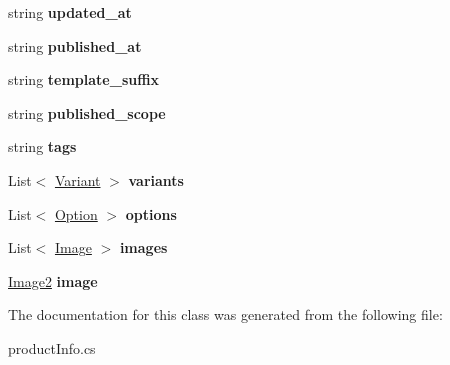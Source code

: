 \begin{DoxyCompactItemize}
string {\bfseries updated\+\_\+at}
\item 
\mbox{\label{class_nexus_1_1_product_a0d284c48bf5e01138e99da3a49663699}} 
string {\bfseries published\+\_\+at}
\item 
\mbox{\label{class_nexus_1_1_product_af2a337fbef04f21f3df79086cc3abd3c}} 
string {\bfseries template\+\_\+suffix}
\item 
\mbox{\label{class_nexus_1_1_product_a1556d89d0f3d8b35ce267019f8f48954}} 
string {\bfseries published\+\_\+scope}
\item 
\mbox{\label{class_nexus_1_1_product_a7acfcece032393bd1ab2ded530b62d09}} 
string {\bfseries tags}
\item 
\mbox{\label{class_nexus_1_1_product_ab179f1716bce65807b714e4640df11a0}} 
List$<$ \mbox{\hyperlink{class_nexus_1_1_variant}{Variant}} $>$ {\bfseries variants}
\item 
\mbox{\label{class_nexus_1_1_product_ab58631dc5cb9e28ec07a6f25051fd5d9}} 
List$<$ \mbox{\hyperlink{class_nexus_1_1_option}{Option}} $>$ {\bfseries options}
\item 
\mbox{\label{class_nexus_1_1_product_a904625c7d82e1eb3d7dc9279f2a1d5b8}} 
List$<$ \mbox{\hyperlink{class_nexus_1_1_image}{Image}} $>$ {\bfseries images}
\item 
\mbox{\label{class_nexus_1_1_product_aa3d5f3e23d067eb29eba02194e2ecd2b}} 
\mbox{\hyperlink{class_nexus_1_1_image2}{Image2}} {\bfseries image}
\end{DoxyCompactItemize}


The documentation for this class was generated from the following file\+:\begin{DoxyCompactItemize}
\item 
product\+Info.\+cs\end{DoxyCompactItemize}

